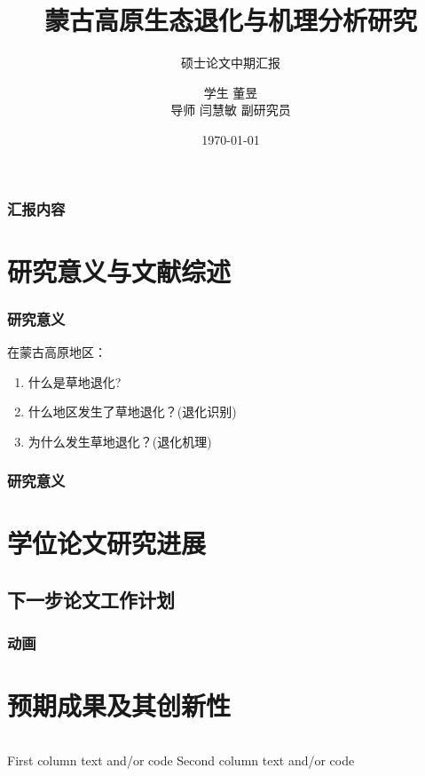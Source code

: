 \documentclass{beamer}
\title[Latex使用模板]{蒙古高原生态退化与机理分析研究}
\subtitle[课程]{硕士论文中期汇报}
\author[Dong Yu]{{\small 学生 董昱 \\ 导师{ }闫慧敏{ }副研究员}}
\date[\today]{\today}
\institute[中科院地理所]{中国科学地理科学与资源研究所\par 中国科学院大学}
\begin{document}
	
	\frame{\titlepage}

	\begin{frame}[label = outline]
		\frametitle{汇报内容}
		\tableofcontents
	\end{frame}

	\section{研究意义与文献综述}

	\begin{frame}[c] %
		\frametitle{研究意义}
        在蒙古高原地区：
        \par
        \par
		\begin{enumerate}
			\item 什么是草地退化?
			\item 什么地区发生了草地退化？(退化识别)
			\item 为什么发生草地退化？(退化机理)
		\end{enumerate}
		
	\end{frame}

    
	\begin{frame}[c] %
		\frametitle{研究意义}
		
	\end{frame}

	\section{学位论文研究进展}
	
	\subsection{下一步论文工作计划}
	
	\begin{frame}[c] %
		\frametitle{动画}


	\end{frame}


	\section{预期成果及其创新性}
	
	\begin{frame}
		\begin{columns}
			First column text and/or code
			Second column text and/or code
		\end{columns}
	\end{frame}
\end{document}
